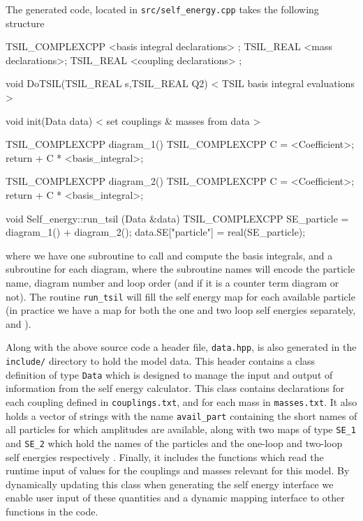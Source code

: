 The generated code, located in \lstinline{src/self_energy.cpp} takes the following structure
\begin{lstcpp}
TSIL_COMPLEXCPP  <basis integral declarations> ;
TSIL_REAL  <mass declarations>;
TSIL_REAL  <coupling declarations> ;

void DoTSIL(TSIL_REAL s,TSIL_REAL Q2)
{
	< TSIL basis integral evaluations >
}

void init(Data data) 
{
	< set couplings & masses from data >
}

TSIL_COMPLEXCPP  diagram_1()
{
	TSIL_COMPLEXCPP C =  <Coefficient>;
	return  + C * <basis_integral>;
}

TSIL_COMPLEXCPP  diagram_2()
{
	TSIL_COMPLEXCPP C =  <Coefficient>;
	return  + C * <basis_integral>;
}

void Self_energy::run_tsil (Data &data) 
{
	TSIL_COMPLEXCPP SE_particle = diagram_1() + diagram_2();
	data.SE["particle"] = real(SE_particle);
}
\end{lstcpp}

where we have one subroutine to call \tsil and compute the basis integrals, and a subroutine for each diagram, where the subroutine names will encode the particle name, diagram number and loop order (and if it is a counter term diagram or not).  The routine \lstinline{run_tsil} will fill the self energy map for each available particle (in practice we have a map for both the one and two loop self energies separately,  and ).

Along with the above source code a header file, \lstinline{data.hpp}, is also generated in the \lstinline{include/} directory to hold the model data.  This header contains a class definition of type \lstinline{Data} which is designed to manage the input and output of information from the self energy calculator.   This class contains declarations for each coupling defined in \lstinline{couplings.txt}, and for each mass in \lstinline{masses.txt}.  It also holds a vector of strings with the name \lstinline{avail_part} containing the short names of all particles for which amplitudes are available, along with two maps of type  \lstinline{SE_1} and \lstinline{SE_2} which hold the names of the particles and the one-loop and two-loop self energies respectively .  Finally, it includes the functions which read the runtime input of values for the couplings and masses relevant for this model.  By dynamically updating this class when generating the self energy interface we enable user input of these quantities and a dynamic mapping interface to other functions in the code.

